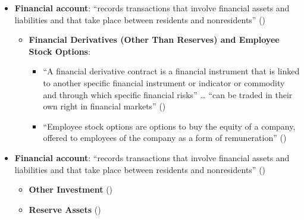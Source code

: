 \documentclass[
  ignorenonframetext,
]{beamer}
\providecommand{\tightlist}{%
  \setlength{\itemsep}{0pt}\setlength{\parskip}{0pt}}\usepackage{longtable,booktabs,array}
\begin{document}
\begin{frame}{}
\label{section-10}
\begin{itemize}
\item
  \textbf{Financial account}: ``records transactions that involve
  financial assets and liabilities and that take place between residents
  and nonresidents''
  ()

  \begin{itemize}
  \item
    \textbf{Financial Derivatives (Other Than Reserves) and Employee
    Stock Options}:

    \begin{itemize}
    \item
      ``A financial derivative contract is a financial instrument that
      is linked to another specific financial instrument or indicator or
      commodity and through which specific financial risks'' \ldots{}
      ``can be traded in their own right in financial markets''
      ()
    \item
      ``Employee stock options are options to buy the equity of a
      company, offered to employees of the company as a form of
      remuneration''
      ()
    \end{itemize}
  \end{itemize}
\end{itemize}
\end{frame}

\begin{frame}{}
\label{section-11}
\begin{itemize}
\item
  \textbf{Financial account}: ``records transactions that involve
  financial assets and liabilities and that take place between residents
  and nonresidents''
  ()

  \begin{itemize}
  \tightlist
  \item
    \textbf{Other Investment}
    ()
  \item
    \textbf{Reserve Assets}
    ()
  \end{itemize}
\end{itemize}
\end{frame}
\end{document}
